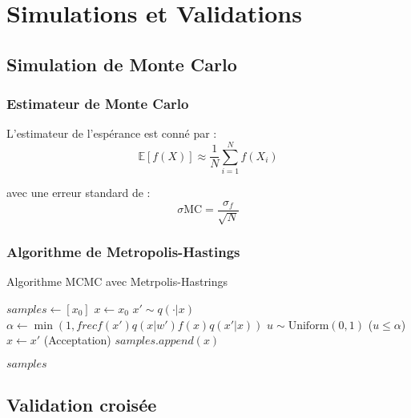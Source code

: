 \chapter{Simulations et Validations}

\section{Simulation de Monte Carlo}

\subsection{Estimateur de Monte Carlo}
L'estimateur de l'espérance est conné par : 
\begin{equation}
	\mathbb{E}[f(X)] \approx \frac{1}{N} \sum_{i=1}^N f(X_i)
	\label{eq:monte-carlo}
\end{equation}

avec une erreur standard de :
\begin{equation}
	\sigma{\text{MC} = \frac{\sigma_f}{\sqrt{N}}}
		\label{eq:mc-error}
\end{equation}

\subsection{Algorithme de Metropolis-Hastings}

\begin{algorithm}[H]
	\caption{Algorithme MCMC avec Metrpolis-Hastrings}
	\begin{algorithmic}[1]
			\State $samples \gets [x_0]$
			\State $x \gets x_0$
				\State $x' \sim q(\cdot | x)$ 
				\State $\alpha \gets \min\left(1, frec{f(x') q(x | w')}{f(x) q(x' | x)}\right)$
				\State $u \sim \text{Uniform}(0, 1)$
				\If($u \leq \alpha$)
					\State $x \gets x'$ \Comment(Acceptation)
				\EndIf
				\State $samples.append(x)$
			\EndFor
			
			\State \Return $samples$
		\EndProcedure
	\end{algorithmic}
	\label{alg:metropolis-hastings}
\end{algorithm}

\section{Validation croisée}

